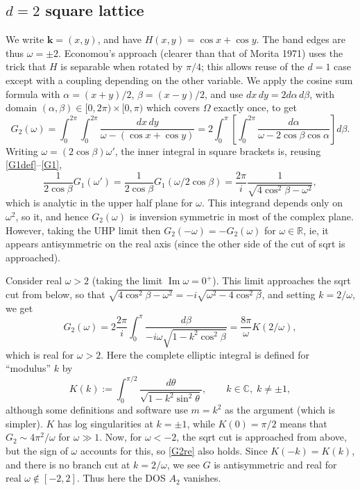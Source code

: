 \documentclass[11pt]{article}
\newcommand{\be}{\begin{equation}}
\newcommand{\ee}{\end{equation}}
\newcommand{\mbf}[1]{{\mathbf #1}}
\newcommand{\R}{\mathbb{R}}
\newcommand{\C}{\mathbb{C}}
\DeclareMathOperator{\im}{Im}
\newcommand{\om}{\omega}
\newcommand{\kk}{\mbf{k}}
\newcommand{\al}{\alpha}
\newcommand{\bt}{\beta}
\begin{document}
\subsection{$d=2$ square lattice}
\label{s:2d}

We write $\kk=(x,y)$, and have $H(x,y) = \cos x + \cos y$. The band edges
are thus $\om = \pm 2$.
Economou's approach (clearer than that of Morita 1971) uses the trick that
$H$ is separable when rotated by $\pi/4$; this allows reuse of the $d=1$
case except with a coupling depending on the other variable.
We apply the cosine sum formula with $\al = (x+y)/2$,
$\bt = (x-y)/2$, and use $dx\,dy = 2 d\al\,d\bt$, with domain
$(\al,\bt) \in [0,2\pi)\times[0,\pi)$ which covers $\Omega$ exactly once,
to get
\be
G_2(\om) = \int_0^{2\pi} \int_0^{2\pi} \frac{dx\,dy}{\om - (\cos x + \cos y)}
=
2 \int_0^{\pi} \left[ \int_0^{2\pi} \frac{d\al}{\om - 2\cos\bt\cos\al} \right]
d\bt.
\ee
Writing $\om=(2\cos\bt)\om'$, the inner integral in square brackets
is, reusing \eqref{G1def}--\eqref{G1},
\[
\frac{1}{2\cos\bt}G_1(\om') = 
\frac{1}{2\cos\bt}G_1(\om/2\cos\bt) =
\frac{2\pi}{i}\frac{1}{\sqrt{4\cos^2\bt - \om^2}},
\]
which is analytic in the upper half plane for $\om$.
This integrand depends only on $\om^2$, so it, and hence
$G_2(\om)$ is inversion symmetric in most of the complex plane.
However, taking the UHP limit then $G_2(-\om) = -G_2(\om)$
for $\om\in\R$, ie, it appears antisymmetric on the real axis
(since the other side of the cut of sqrt is approached).

Consider real $\om>2$ (taking the limit $\im \om = 0^+$).
This limit approaches the sqrt cut from below, so that
$\sqrt{4\cos^2\bt - \om^2} = -i\sqrt{\om^2 - 4\cos^2\bt}$, and
setting $k=2/\om$, we get
\be
G_2(\om) = 2 \frac{2\pi}{i} \int_0^{\pi} \frac{d\bt}{-i \om \sqrt{1-k^2\cos^2\bt}}
= \frac{8\pi}{\om}K(2/\om),
\label{G2re}
\ee
which is real for $\om>2$.
Here the complete elliptic integral is defined for ``modulus'' $k$ by
\be
K(k) := \int_0^{\pi/2} \frac{d\theta}{\sqrt{1-k^2\sin^2 \theta}},
\qquad k\in\C, \; k\neq \pm 1,
\label{ellipk}
\ee
although some definitions and software use $m=k^2$ as the argument
(which is simpler).
$K$ has log singularities at $k=\pm 1$, while $K(0) = \pi/2$
means that $G_2 \sim 4\pi^2/\om$ for $\om\gg 1$.
Now, for $\om<-2$, the sqrt cut is approached from above,
but the sign of $\om$ accounts for this, so \eqref{G2re} also holds.
Since $K(-k) = K(k)$, and there is no branch cut at $k=2/\om$,
we see $G$ is antisymmetric and real for real $\om\notin[-2,2]$.
Thus here the DOS $A_2$ vanishes.
\end{document}
